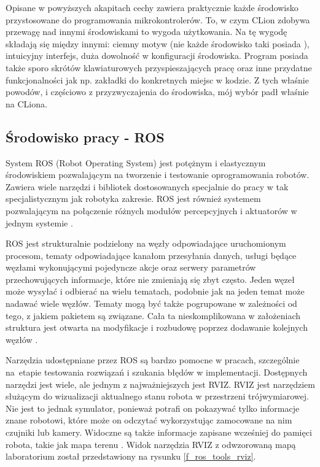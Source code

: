 Opisane w powyższych akapitach cechy zawiera praktycznie każde środowisko przystosowane do programowania mikrokontrolerów. To, w czym CLion zdobywa przewagę nad innymi środowiskami to wygoda użytkowania. Na tę wygodę składają się między innymi: ciemny motyw (nie każde środowisko taki posiada%
), intuicyjny interfejs, duża dowolność w konfiguracji środowiska. Program posiada także sporo skrótów klawiaturowych przyspieszających pracę oraz inne przydatne funkcjonalności jak np. zakładki do konkretnych miejsc w kodzie. Z tych właśnie powodów, i częściowo z przyzwyczajenia do środowiska, mój wybór padł właśnie na CLiona.




\subsection{Środowisko pracy - ROS}

System ROS (Robot Operating System) jest potężnym i elastycznym środowiskiem pozwalającym na tworzenie i testowanie oprogramowania robotów. Zawiera wiele narzędzi i bibliotek dostosowanych specjalnie do pracy w tak specjalistycznym jak robotyka zakresie. ROS jest również systemem pozwalającym na połączenie różnych modułów percepcyjnych i aktuatorów w jednym systemie \cite{b_site_ROS}.

ROS jest strukturalnie podzielony na węzły odpowiadające uruchomionym procesom, tematy odpowiadające kanałom przesyłania danych, usługi będące węzłami wykonującymi pojedyncze akcje oraz serwery parametrów przechowujących informacje, które nie zmieniają się zbyt często. Jeden węzeł może wysyłać i odbierać na wielu tematach, podobnie jak na jeden temat może nadawać wiele węzłów. Tematy mogą być także pogrupowane w zależności od tego, z jakiem pakietem są związane. Cała ta nieskomplikowana w założeniach struktura jest otwarta na modyfikacje i rozbudowę poprzez dodawanie kolejnych węzłów \cite{b_site_ROS_wiki}.

Narzędzia udostępniane przez ROS są bardzo pomocne w pracach, szczególnie na~etapie testowania rozwiązań i szukania błędów w implementacji. Dostępnych narzędzi jest wiele, ale jednym z najważniejszych jest RVIZ. RVIZ jest narzędziem służącym do wizualizacji aktualnego stanu robota w przestrzeni trójwymiarowej. Nie jest to jednak symulator, ponieważ potrafi on pokazywać tylko informacje znane robotowi, które może on odczytać wykorzystując zamocowane na nim czujniki lub kamery. Widoczne są także informacje zapisane wcześniej do pamięci robota, takie jak mapa terenu \cite{b_site_ROS_tools}. Widok narzędzia RVIZ z odwzorowaną mapą laboratorium został przedstawiony na rysunku \ref{f_ros_tools_rviz}.

